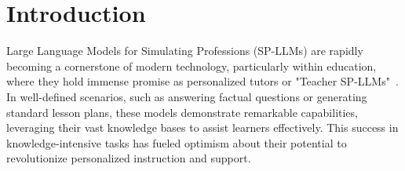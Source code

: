 \documentclass[letterpaper]{article} %
\begin{document}


\section{Introduction}
Large Language Models for Simulating Professions (SP-LLMs) are rapidly becoming a cornerstone of modern technology, particularly within education, where they hold immense promise as personalized tutors or "Teacher SP-LLMs"~\cite{liu2024socraticlm, zhang2024simulating}. In well-defined scenarios, such as answering factual questions or generating standard lesson plans, these models demonstrate remarkable capabilities, leveraging their vast knowledge bases to assist learners effectively. This success in knowledge-intensive tasks has fueled optimism about their potential to revolutionize personalized instruction and support.
\end{document}
